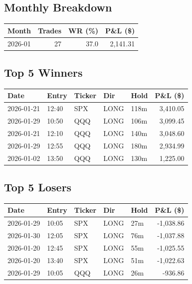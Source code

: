 \documentclass[11pt,a4paper,twoside]{article}
\begin{document}
\subsection{Monthly Breakdown}
\noindent\begin{center}
\begin{tabular}{>{\color{txtmain}}l rrr}
\toprule
\rowcolor{cardbg}
\textbf{Month} & \textbf{Trades} & \textbf{WR (\%)} & \textbf{P\&L (\$)} \\
\midrule
2026-01 & 27 & 37.0 & \textcolor{wingreen}{2,141.31} \\
\bottomrule
\end{tabular}
\end{center}
\subsection{Top 5 Winners}
\noindent\begin{center}
\begin{tabular}{>{\color{txtmain}}l llll r}
\toprule
\rowcolor{cardbg}
\textbf{Date} & \textbf{Entry} & \textbf{Ticker} & \textbf{Dir} & \textbf{Hold} & \textbf{P\&L (\$)} \\
\midrule
2026-01-21 & 12:40 & SPX & LONG & 118m & \textcolor{wingreen}{3,410.05} \\
2026-01-29 & 10:50 & QQQ & LONG & 106m & \textcolor{wingreen}{3,099.45} \\
2026-01-21 & 12:10 & QQQ & LONG & 140m & \textcolor{wingreen}{3,048.60} \\
2026-01-29 & 12:55 & QQQ & LONG & 180m & \textcolor{wingreen}{2,934.99} \\
2026-01-02 & 13:50 & QQQ & LONG & 130m & \textcolor{wingreen}{1,225.00} \\
\bottomrule
\end{tabular}
\end{center}
\subsection{Top 5 Losers}
\noindent\begin{center}
\begin{tabular}{>{\color{txtmain}}l llll r}
\toprule
\rowcolor{cardbg}
\textbf{Date} & \textbf{Entry} & \textbf{Ticker} & \textbf{Dir} & \textbf{Hold} & \textbf{P\&L (\$)} \\
\midrule
2026-01-29 & 10:05 & SPX & LONG & 27m & \textcolor{lossred}{-1,038.86} \\
2026-01-30 & 12:05 & SPX & LONG & 76m & \textcolor{lossred}{-1,037.88} \\
2026-01-20 & 12:45 & SPX & LONG & 55m & \textcolor{lossred}{-1,025.55} \\
2026-01-20 & 13:40 & SPX & LONG & 51m & \textcolor{lossred}{-1,022.63} \\
2026-01-29 & 10:05 & QQQ & LONG & 26m & \textcolor{lossred}{-936.86} \\
\bottomrule
\end{tabular}
\end{center}
\clearpage
\end{document}
